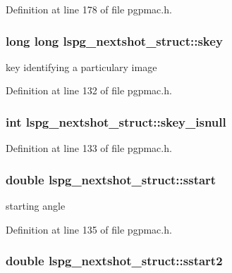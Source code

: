 Definition at line 178 of file pgpmac.h.\hypertarget{structlspg__nextshot__struct_af64a4e3f17752b5f1f05fb15d6f48382}{
\subsubsection[{skey}]{\setlength{\rightskip}{0pt plus 5cm}long long {\bf lspg\_\-nextshot\_\-struct::skey}}}
\label{structlspg__nextshot__struct_af64a4e3f17752b5f1f05fb15d6f48382}


key identifying a particulary image 

Definition at line 132 of file pgpmac.h.\hypertarget{structlspg__nextshot__struct_abd3c69357470052eb79ddd8eddd57b2c}{
\subsubsection[{skey\_\-isnull}]{\setlength{\rightskip}{0pt plus 5cm}int {\bf lspg\_\-nextshot\_\-struct::skey\_\-isnull}}}
\label{structlspg__nextshot__struct_abd3c69357470052eb79ddd8eddd57b2c}


Definition at line 133 of file pgpmac.h.\hypertarget{structlspg__nextshot__struct_a8dc11eaa094d59f61642c4abc226918f}{
\subsubsection[{sstart}]{\setlength{\rightskip}{0pt plus 5cm}double {\bf lspg\_\-nextshot\_\-struct::sstart}}}
\label{structlspg__nextshot__struct_a8dc11eaa094d59f61642c4abc226918f}


starting angle 

Definition at line 135 of file pgpmac.h.\hypertarget{structlspg__nextshot__struct_a8445cbd2206dc6d62b6bd433f5218c98}{
\subsubsection[{sstart2}]{\setlength{\rightskip}{0pt plus 5cm}double {\bf lspg\_\-nextshot\_\-struct::sstart2}}}
\label{structlspg__nextshot__struct_a8445cbd2206dc6d62b6bd433f5218c98}


